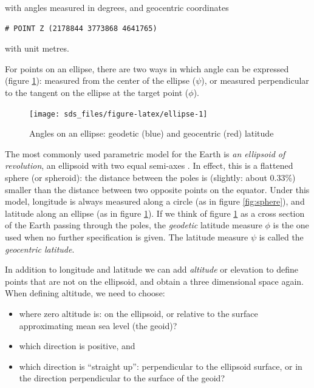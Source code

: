 \documentclass[]{book}
\providecommand{\tightlist}{%
  \setlength{\itemsep}{0pt}\setlength{\parskip}{0pt}}
\begin{document}
with angles measured in degrees, and geocentric coordinates

\begin{verbatim}
# POINT Z (2178844 3773868 4641765)
\end{verbatim}

with unit metres.

For points on an ellipse, there are two ways in which angle can be
expressed (figure \ref{fig:ellipse}): measured from the center of
the ellipse (\(\psi\)), or measured perpendicular to the tangent on
the ellipse at the target point (\(\phi\)).

\begin{figure}

{\centering \texttt{[image: sds\_files/figure-latex/ellipse-1]} 

}

\caption{Angles on an ellipse: geodetic (blue) and geocentric (red) latitude}\label{fig:ellipse}
\end{figure}

The most commonly used parametric model for the Earth is \emph{an
ellipsoid of revolution}, an ellipsoid with two equal semi-axes
\citep{iliffelott}. In effect, this is a flattened sphere (or spheroid):
the distance between the poles is (slightly: about 0.33\%) smaller
than the distance between two opposite points on the equator. Under
this model, longitude is always measured along a circle (as in
figure \ref{fig:sphere}), and latitude along an ellipse (as in
figure \ref{fig:ellipse}). If we
think of figure \ref{fig:ellipse} as a cross section of the Earth
passing through the poles, the \emph{geodetic} latitude measure \(\phi\)
is the one used when no further specification is given. The latitude
measure \(\psi\) is called the \emph{geocentric latitude}.

In addition to longitude and latitude we can add \emph{altitude}
or elevation to define points that are not on the ellipsoid, and
obtain a three dimensional space again. When defining altitude,
we need to choose:

\begin{itemize}
\tightlist
\item
  where zero altitude is: on the ellipsoid, or relative to the surface approximating mean sea level (the geoid)?
\item
  which direction is positive, and
\item
  which direction is ``straight up'': perpendicular to the ellipsoid surface,
  or in the direction perpendicular to the surface of the geoid?
\end{itemize}
\end{document}
